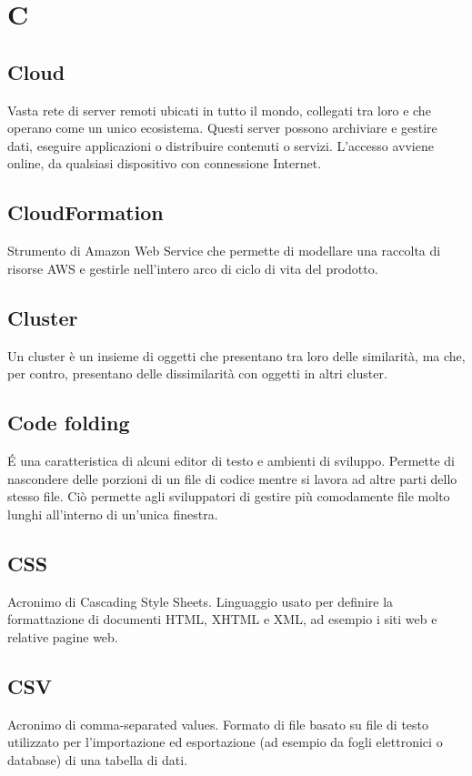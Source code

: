 \section*{C}
\markright{}
\subsection*{Cloud}
Vasta rete di server remoti ubicati in tutto il mondo, collegati tra loro e che operano come un unico ecosistema. Questi server possono archiviare e gestire dati, eseguire applicazioni o distribuire contenuti o servizi. L'accesso avviene online, da qualsiasi dispositivo con connessione Internet.
\subsection*{CloudFormation}
Strumento di Amazon Web Service che permette di modellare una raccolta di risorse AWS e gestirle nell'intero arco di ciclo di vita del prodotto.
\subsection*{Cluster}
Un cluster è un insieme di oggetti che presentano tra loro delle similarità, ma che, per contro, presentano delle dissimilarità con oggetti in altri cluster.
\subsection*{Code folding}
\'E una caratteristica di alcuni editor di testo e ambienti di sviluppo. Permette di nascondere delle porzioni di un file di codice mentre si lavora ad altre parti dello stesso file. Ciò permette agli sviluppatori di gestire più comodamente file molto lunghi all'interno di un'unica finestra.
\subsection*{CSS}
Acronimo di Cascading Style Sheets. Linguaggio usato per definire la formattazione di documenti HTML, XHTML e XML, ad esempio i siti web e relative pagine web.
\subsection*{CSV}
Acronimo di comma-separated values. Formato di file basato su file di testo utilizzato per l'importazione ed esportazione (ad esempio da fogli elettronici o database) di una tabella di dati. 
